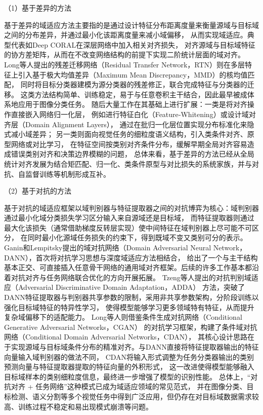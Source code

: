 （1）基于差异的方法

基于差异的域适应方法主要指的是通过设计特征分布距离度量来衡量源域与目标域之间的分布差异，并通过最小化该距离度量来减小域偏移，
从而实现域适应。典型代表如Deep CORAL\cite{deepcoral}在深层网络中加入相关对齐损失，
对齐源域与目标域特征的协方差矩阵，从而在不改变网络结构的前提下实现二阶统计层面的域对齐。
Long等人\cite{RTN}提出的残差迁移网络（Residual Transfer Network，RTN）则在多层特征上引入基于极大均值差异（Maximum Mean Discrepancy，MMD）的核均值匹配，
同时将目标分类器建模为源分类器的残差修正，联合完成特征与分类器的迁移。
这类方法结构简单、训练稳定，易于与任意卷积主干结合，因此最早被成体系地应用于图像分类任务。
随后大量工作在其基础上进行扩展：一类是将对齐操作直接嵌入网络归一化层，
例如进行特征白化（Feature‑Whitening）\cite{roy2019unsupervised}或设计域对齐层（Domain Alignment Layers）\cite{multidial}，
通过在批归一化层位置实现分布标准化来隐式减小域差异；
另一类则面向视觉任务的细粒度语义结构，引入类条件对齐、原型网络或对比学习\cite{cdcl,clusteralignment,orthogonalclustered}，
在特征空间按类别对齐条件分布，缓解早期全局对齐容易造成错误类别对齐和决策边界模糊的问题，
总体来看，基于差异的方法已经从全局统计对齐发展为结合矩匹配、归一化、类条件原型与对比损失的系统家族，并与对抗、自监督训练等机制形成互补。


（2）基于对抗的方法

基于对抗的域适应框架以域判别器与特征提取器之间的对抗博弈为核心：域判别器通过最小化域分类损失学习区分输入来自源域还是目标域，
而特征提取器则通过最大化该损失（通常借助梯度反转层实现）使中间特征在域判别器上尽可能不可区分，
在同时最小化源域任务损失的约束下，得到既域不变又类别可分的表示。
Ganin和Lempitsky提出\cite{ganin2015unsupervised}的域对抗网络（Domain Adversarial Neural Network，DANN），首次将对抗学习思想与深度域适应方法相结合，
给出了一个与主干结构基本正交、可直接插入任意骨干网络的通用域对齐框架。后续的许多工作基本都沿着对抗对齐与任务网络联合优化的方向开展拓展。
Tzeng等人\cite{tzeng2017adversarial}提出的对抗判别域适应（Adversarial Discriminative Domain Adaptation，ADDA）
方法，突破了DANN特征提取器与判别器共享参数的限制，采用非共享参数架构，分阶段训练以强化目标域特征的特异性学习，
使得模型能够学习更多领域特有特征，从而提升复杂域偏移下的适配能力。
Long等人\cite{long2018conditional}则借鉴条件生成对抗网络（Conditional Generative Adversarial Networks，CGAN）\cite{mirza2014conditional}
的对抗学习框架，构建了条件域对抗网络（Conditional Domain Adversarial Networks，CDAN），
其核心设计思路在于实现源域与目标域条件分布的精准对齐。与DANN直接将特征提取器输出的特征向量输入域判别器的做法不同，
CDAN将输入形式调整为任务分类器输出的类别预测向量与特征提取器提取的特征向量的外积形式，
这一改进使得模型能够融入目标域样本的类别细粒度信息，最终进一步增强了模型的识别性能。
总体上，“对抗对齐 + 任务网络”这种模式已成为域适应领域的常见范式\cite{pei2018multi,hoffman2018cycada,tang2020discriminative,cao2018partial}，
并在图像分类、目标检测、语义分割等多个视觉任务中得到广泛应用\cite{hassanpour2023survey}，但仍存在对目标域数据需求较高、训练过程不稳定和易出现模式崩溃等问题。



